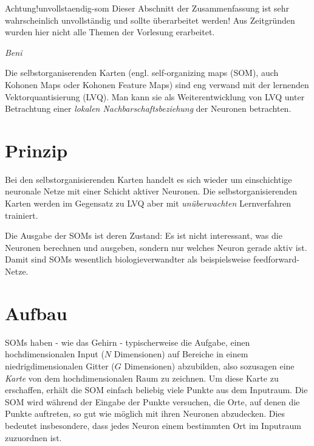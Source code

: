\begin{hint}{Achtung!}{unvollstaendig-som}
	Dieser Abschnitt der Zusammenfassung ist sehr wahrscheinlich unvollständig und sollte überarbeitet werden!
	Aus Zeitgründen wurden hier nicht alle Themen der Vorlesung erarbeitet.
	\begin{flushright}\textit{Beni}\end{flushright}
\end{hint}
\noindent
Die selbstorganiserenden Karten (engl. self-organizing maps (SOM), auch Kohonen Maps oder Kohonen Feature Maps) sind eng verwand mit der lernenden Vektorquantisierung (LVQ). Man kann sie als Weiterentwicklung von LVQ unter Betrachtung einer \emph{lokalen Nachbarschaftsbeziehung} der Neuronen betrachten.


\section*{Prinzip}
Bei den selbstorganisierenden Karten handelt es sich wieder um einschichtige neuronale Netze mit einer Schicht aktiver Neuronen. Die selbstorganisierenden Karten werden im Gegensatz zu LVQ aber mit \emph{unüberwachten} Lernverfahren trainiert.

Die Ausgabe der SOMs ist deren Zustand: Es ist nicht interessant, was die Neuronen berechnen und ausgeben, sondern nur welches Neuron gerade aktiv ist. Damit sind SOMs wesentlich biologieverwandter als beispielsweise feedforward-Netze.



\section*{Aufbau}
SOMs haben - wie das Gehirn - typischerweise die Aufgabe, einen hochdimensionalen Input ($N$ Dimensionen) auf Bereiche in einem niedrigdimensionalen Gitter ($G$ Dimensionen) abzubilden, also sozusagen eine \emph{Karte} von dem hochdimensionalen Raum zu zeichnen. Um diese Karte zu erschaffen, erhält die SOM einfach beliebig viele Punkte aus dem Inputraum.
Die SOM wird während der Eingabe der Punkte versuchen, die Orte, auf denen die Punkte auftreten, so gut wie möglich mit ihren Neuronen abzudecken. Dies bedeutet insbesondere, dass jedes Neuron einem bestimmten Ort im Inputraum zuzuordnen ist.

